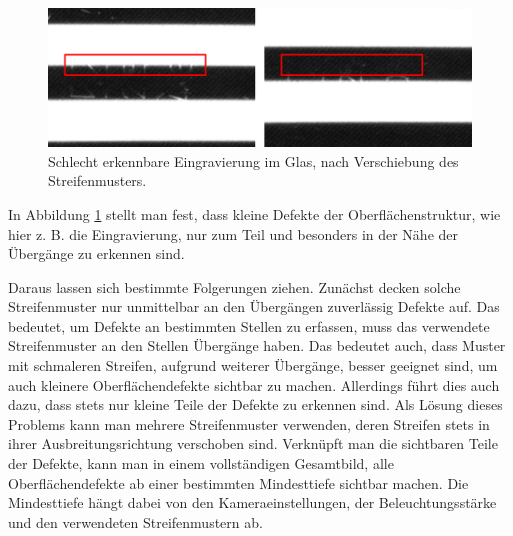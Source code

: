 \begin{figure}[H]
	\centering
	\includegraphics[width=\textwidth]{03_sichtpruefungDurchLichtstreuung/verfahren/figures/minorScratch}
	\caption[Eingravierung im Glas]{Schlecht erkennbare Eingravierung im Glas, nach Verschiebung des Streifenmusters.}
	\label{img:engraving}
\end{figure}

\noindent
In Abbildung \ref{img:engraving} stellt man fest, dass kleine Defekte der Oberflächenstruktur, wie hier z. B. die Eingravierung, nur zum Teil und besonders in der Nähe der Übergänge zu erkennen sind.

\p
Daraus lassen sich bestimmte Folgerungen ziehen.
Zunächst decken solche Streifenmuster nur unmittelbar an den Übergängen zuverlässig Defekte auf.
Das bedeutet, um Defekte an bestimmten Stellen zu erfassen, muss das verwendete Streifenmuster an den Stellen Übergänge haben.
Das bedeutet auch, dass Muster mit schmaleren Streifen, aufgrund weiterer Übergänge, besser geeignet sind, um auch kleinere Oberflächendefekte sichtbar zu machen.
Allerdings führt dies auch dazu, dass stets nur kleine Teile der Defekte zu erkennen sind.
Als Lösung dieses Problems kann man mehrere Streifenmuster verwenden, deren Streifen stets in ihrer Ausbreitungsrichtung verschoben sind.
Verknüpft man die sichtbaren Teile der Defekte, kann man in einem vollständigen Gesamtbild, alle Oberflächendefekte ab einer bestimmten Mindesttiefe sichtbar machen.
Die Mindesttiefe hängt dabei von den Kameraeinstellungen, der Beleuchtungsstärke und den verwendeten Streifenmustern ab.
